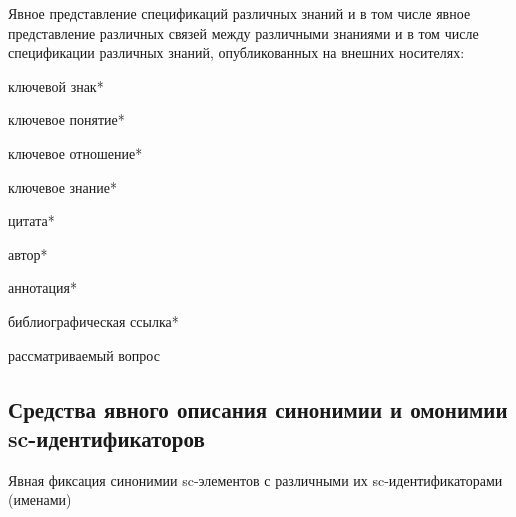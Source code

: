 Явное представление спецификаций различных знаний и в том числе явное представление различных связей между различными знаниями и в том числе спецификации различных знаний, опубликованных на внешних носителях:
\begin{textitemize}
	\item ключевой знак*
	\item ключевое понятие*
	\item ключевое отношение*
	\item ключевое знание*
	\item цитата*
	\item автор*
	\item аннотация*
	\item библиографическая ссылка*
	\item рассматриваемый вопрос
\end{textitemize}

\begin{SCn}
	\begin{scnindent}
	\end{scnindent} 
\end{SCn}

\begin{SCn}
\end{SCn}

\begin{SCn}
\end{SCn}

\newpage
\subsection{Средства явного описания синонимии и омонимии sc-идентификаторов}
\label{subsec_means_explicit_description_synonymy_homonymy_sc-ident}
Явная фиксация синонимии sc-элементов с различными их sc-идентификаторами (именами)

